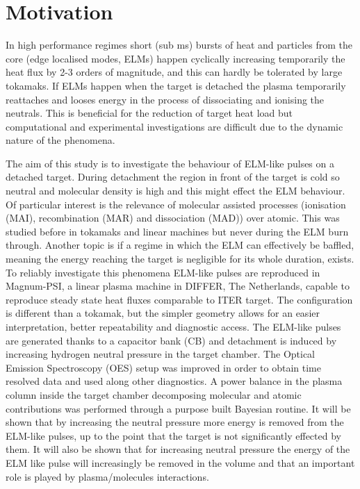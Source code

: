 

\section{Motivation}\label{Motivation magnum-psi}


In high performance regimes short (sub ms) bursts of heat and particles from the core (edge localised modes, ELMs) happen cyclically increasing temporarily the heat flux by 2-3 orders of magnitude, and this can hardly be tolerated by large tokamaks. \cite{Jachmich2011} If ELMs happen when the target is detached the plasma temporarily reattaches and looses energy in the process of dissociating and ionising the neutrals. This is beneficial for the reduction of target heat load but computational and experimental investigations are difficult due to the dynamic nature of the phenomena.

The aim of this study is to investigate the behaviour of ELM-like pulses on a detached target. During detachment the region in front of the target is cold so neutral and molecular density is high and this might effect the ELM behaviour. Of particular interest is the relevance of molecular assisted processes (ionisation (MAI), recombination (MAR) and dissociation (MAD)) over atomic. This was studied before in tokamaks and linear machines but never during the ELM burn through. \cite{Akkermans2020,Verhaegh2021a} Another topic is if a regime in which the ELM can effectively be baffled, meaning the energy reaching the target is negligible for its whole duration, exists.
To reliably investigate this phenomena ELM-like pulses are reproduced in Magnum-PSI, a linear plasma machine in DIFFER, The Netherlands, capable to reproduce steady state heat fluxes comparable to ITER target. The configuration is different than a tokamak, but the simpler geometry allows for an easier interpretation, better repeatability and diagnostic access. The ELM-like pulses are generated thanks to a capacitor bank (CB) and detachment is induced by increasing hydrogen neutral pressure in the target chamber.
The Optical Emission Spectroscopy (OES) setup was improved in order to obtain time resolved data and used along other diagnostics. A power balance in the plasma column inside the target chamber decomposing molecular and atomic contributions was performed through a purpose built Bayesian routine.
It will be shown that by increasing the neutral pressure more energy is removed from the ELM-like pulses, up to the point that the target is not significantly effected by them. It will also be shown that for increasing neutral pressure the energy of the ELM like pulse will increasingly be removed in the volume and that an important role is played by plasma/molecules interactions.

